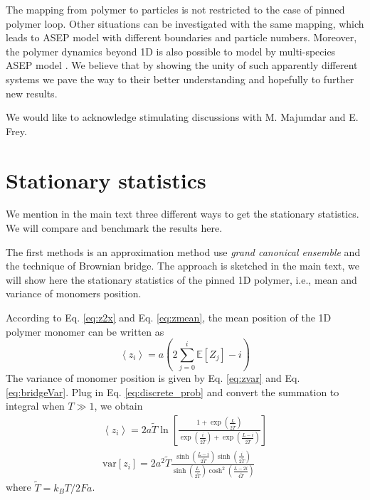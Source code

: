 \documentclass[aps,showpacs,twocolumn,floatfix,prx,superscriptaddress]{revtex4-1}
\begin{document}
The mapping from polymer to particles is not restricted to the case of pinned polymer loop. Other situations can be investigated with the same mapping, which leads to ASEP model with different boundaries and particle numbers. Moreover, the polymer dynamics beyond 1D is also possible to
model by multi-species ASEP model \cite{}. We believe that by showing the unity of such apparently different systems we pave the way to their better understanding and hopefully to further new results.
\begin{acknowledgments}
We would like to acknowledge stimulating discussions with M. Majumdar and E. Frey.\end{acknowledgments}


\appendix


\section{Stationary statistics}
\label{sec:stationary_statistics}
We mention in the main text three different ways to get the stationary statistics. We will compare and benchmark the results here.

The first methods is an approximation method use \emph{grand canonical ensemble} and the technique of Brownian bridge. The approach is sketched in the main text, we will show here the stationary statistics of the pinned 1D polymer, i.e., mean and variance of monomers position.

According to Eq. \eqref{eq:z2x} and Eq. \eqref{eq:zmean}, the mean position of the 1D polymer monomer can be written as 
\begin{equation}
    \label{eq:polymerMeanPos}
    \left< z_i \right> = a \left( 2 \sum_{j=0}^i \mathbb{E}\left[Z_j\right] - i \right)
\end{equation}
The variance of monomer position is given by Eq. \eqref{eq:zvar} and Eq. \eqref{eq:bridgeVar}. Plug in Eq. \eqref{eq:discrete_prob} and convert the summation to integral when $T\gg 1$, we obtain
\begin{subequations}
    \label{eq:meanVarPolymerPos}
    \begin{eqnarray}
        \left< z_i \right> = 2 a \tilde{T} \ln\left[ \frac{1+\exp\left(\frac{L}{2\tilde{T}}\right)}{\exp\left(\frac{i}{2\tilde{T}}\right) + \exp\left(\frac{L-i}{2\tilde{T}}\right)} \right] \\
        \text{var}\left[z_i\right] = 2 a^2 \tilde{T} \frac{ \sinh\left( \frac{L-i}{2\tilde{T}}\right) \sinh\left( \frac{i}{2\tilde{T}}\right)} {\sinh\left( \frac{L}{2\tilde{T}}\right) \cosh^2\left( \frac{L-2i}{4\tilde{T}}\right)}
    \end{eqnarray}
\end{subequations}
where $\tilde{T} = k_B T / 2Fa$. 
\end{document}
